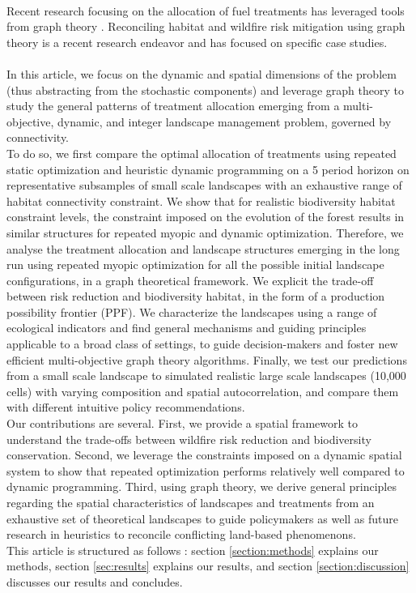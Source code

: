 \\
Recent research focusing on the allocation of fuel treatments has leveraged tools from graph theory \citep{matsypura_wildfire_2018, pais_downstream_2021}. Reconciling habitat and wildfire risk mitigation using graph theory is a recent research endeavor \citep{rachmawati_fuel_2018, yemshanov_exploring_2022} and has focused on specific case studies. 
\\\\
\hspace*{1.5em} In this article, we focus on the dynamic and spatial dimensions of the problem (thus abstracting from the stochastic components) and leverage graph theory to study the general patterns of treatment allocation emerging from a multi-objective, dynamic, and integer landscape management problem, governed by connectivity. \\
To do so, we first compare the optimal allocation of treatments using repeated static optimization and heuristic dynamic programming on a 5 period horizon on representative subsamples of small scale landscapes with an exhaustive range of habitat connectivity constraint. We show that for realistic biodiversity habitat constraint levels, the constraint imposed on the evolution of the forest results in similar structures for repeated myopic and dynamic optimization. Therefore, we analyse the treatment allocation and landscape structures emerging in the long run using repeated myopic optimization for all the possible initial landscape configurations, in a graph theoretical framework. We explicit the trade-off between risk reduction and biodiversity habitat, in the form of a production possibility frontier (PPF). We characterize the landscapes using a range of ecological indicators and find general mechanisms and guiding principles applicable to a broad class of settings, to guide decision-makers and foster new efficient multi-objective graph theory algorithms. Finally, we test our predictions from a small scale landscape to simulated realistic large scale landscapes (10,000 cells)  with varying composition and spatial autocorrelation, and compare them with different intuitive policy recommendations. 
\\
Our contributions are several. First, we provide a spatial framework to understand the trade-offs between wildfire risk reduction and biodiversity conservation. Second, we leverage the constraints imposed on a dynamic spatial system to show that repeated optimization performs relatively well compared to dynamic programming. Third, using graph theory, we derive general principles regarding the spatial characteristics of landscapes and treatments from an exhaustive set of theoretical landscapes to guide policymakers as well as future research in heuristics to reconcile conflicting land-based phenomenons.
\\
This article is structured as follows : section \ref{section:methods} explains our methods, section \ref{sec:results} explains our results, and section \ref{section:discussion} discusses our results and concludes. 


